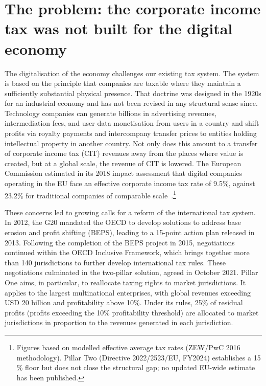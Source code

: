 \documentclass[../../main]{subfiles}
\begin{document}
\section{The problem: the corporate income tax was not built for the digital economy}
\label{sec:problem}


The digitalisation of the economy challenges our existing tax system.
The system is based on the principle that companies are taxable where they maintain a sufficiently substantial physical presence.
That doctrine was designed in the 1920s for an industrial economy and has not been revised in any structural sense since.
Technology companies can generate billions in advertising revenues, intermediation fees, and user data monetisation from users in a country and shift profits via royalty payments and intercompany transfer prices to entities holding intellectual property in another country.
Not only does this amount to a transfer of corporate income tax (CIT) revenues away from the places where value is created, but at a global scale, the revenue of CIT is lowered.
The European Commission estimated in its 2018 impact assessment that digital companies operating in the EU face an effective corporate income tax rate of 9.5\%, against 23.2\% for traditional companies of comparable scale~\citep{swd_2018_81}.\footnote{Figures based on modelled effective average tax rates (ZEW/PwC 2016 methodology). Pillar Two (Directive 2022/2523/EU, FY2024) establishes a 15\,\% floor but does not close the structural gap; no updated EU-wide estimate has been published.}



These concerns led to growing calls for a reform of the international tax system.
In 2012, the G20 mandated the OECD to develop solutions to address base erosion and profit shifting (BEPS), leading to a 15-point action plan released in 2013.
Following the completion of the BEPS project in 2015, negotiations continued within the OECD Inclusive Framework, which brings together more than 140 jurisdictions to further develop international tax rules.
These negotiations culminated in the two-pillar solution, agreed in October 2021.
Pillar One aims, in particular, to reallocate taxing rights to market jurisdictions.
It applies to the largest multinational enterprises, with global revenues exceeding USD 20 billion and profitability above 10\%. 
Under its rules, 25\% of residual profits (profits exceeding the 10\% profitability threshold) are allocated to market jurisdictions in proportion to the revenues generated in each jurisdiction.
\end{document}
